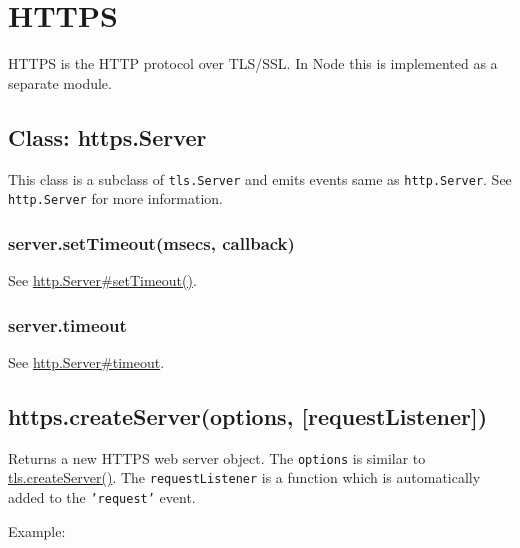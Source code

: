 \section{HTTPS}

\begin{Shaded}
\begin{Highlighting}[]
\NormalTok{: } 
\end{Highlighting}
\end{Shaded}

HTTPS is the HTTP protocol over TLS/SSL. In Node this is implemented as
a separate module.

\subsection{Class: https.Server}

This class is a subclass of \texttt{tls.Server} and emits events same as
\texttt{http.Server}. See \texttt{http.Server} for more information.

\subsubsection{server.setTimeout(msecs, callback)}

See
\href{http.html\#http\_server\_settimeout\_msecs\_callback}{http.Server\#setTimeout()}.

\subsubsection{server.timeout}

See \href{http.html\#http\_server\_timeout}{http.Server\#timeout}.

\subsection{https.createServer(options, {[}requestListener{]})}

Returns a new HTTPS web server object. The \texttt{options} is similar
to
\href{tls.html\#tls\_tls\_createserver\_options\_secureconnectionlistener}{tls.createServer()}.
The \texttt{requestListener} is a function which is automatically added
to the \texttt{'request'} event.

Example:

